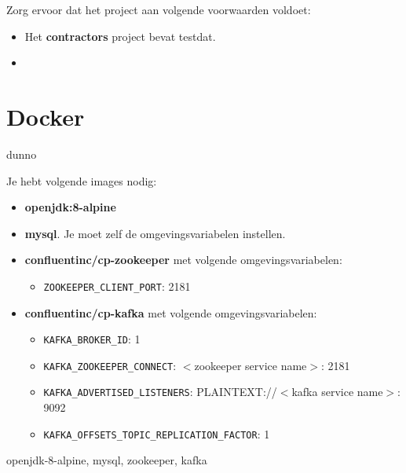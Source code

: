 \documentclass{article}
\begin{document}

Zorg ervoor dat het project aan volgende voorwaarden voldoet:
\begin{itemize}
	\item Het \textbf{contractors} project bevat testdat.
	\item 
\end{itemize}

\section*{Docker}

dunno

Je hebt volgende images nodig:
\begin{itemize}
	\item \textbf{openjdk:8-alpine}
	\item \textbf{mysql}. Je moet zelf de omgevingsvariabelen instellen.
	\item \textbf{confluentinc/cp-zookeeper} met volgende omgevingsvariabelen:
	\begin{itemize}
		\item \texttt{ZOOKEEPER\_CLIENT\_PORT}: 2181
	\end{itemize}
	\item \textbf{confluentinc/cp-kafka} met volgende omgevingsvariabelen:
	\begin{itemize}
		\item \texttt{KAFKA\_BROKER\_ID}: 1
		\item \texttt{KAFKA\_ZOOKEEPER\_CONNECT}: $<$zookeeper service name$>$: 2181
		\item \texttt{KAFKA\_ADVERTISED\_LISTENERS}: PLAINTEXT://$<$kafka service name$>$: 9092
		\item \texttt{KAFKA\_OFFSETS\_TOPIC\_REPLICATION\_FACTOR}: 1
	\end{itemize}
		
\end{itemize}
openjdk-8-alpine, mysql, zookeeper, kafka
\end{document}
